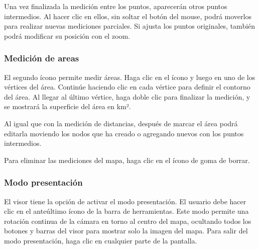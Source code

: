 \documentclass[a4paper,11pt,openany,spanish]{sphinxmanual}
\begin{document}
\noindent{}

\sphinxAtStartPar
Una vez finalizada la medición entre los puntos, aparecerán otros puntos intermedios. Al hacer clic en ellos, sin soltar el botón del mouse, podrá moverlos para realizar nuevas mediciones parciales. Si ajusta los puntos originales, también podrá modificar su posición con el zoom.

\noindent{}


\subsubsection{Medición de areas}
\label{\detokenize{tools/measuring:medicion-de-areas}}

\sphinxAtStartPar
El segundo ícono permite medir áreas. Haga clic en el ícono y luego en uno de los vértices del área. Continúe haciendo clic en cada vértice para definir el contorno del área. Al llegar al último vértice, haga doble clic para finalizar la medición, y se mostrará la superficie del área en km².

\sphinxAtStartPar
Al igual que con la medición de distancias, después de marcar el área podrá editarla moviendo los nodos que ha creado o agregando nuevos con los puntos intermedios.

\noindent{}

\sphinxAtStartPar
Para eliminar las mediciones del mapa, haga clic en el ícono de goma de borrar.



\subsubsection{Modo presentación}
\label{\detokenize{tools/measuring:modo-presentacion}}

\sphinxAtStartPar
El visor tiene la opción de activar el modo presentación. El usuario debe hacer clic en el anteúltimo ícono de la barra de herramientas. Este modo permite una rotación continua de la cámara en torno al centro del mapa, ocultando todos los botones y barras del visor para mostrar solo la imagen del mapa. Para salir del modo presentación, haga clic en cualquier parte de la pantalla.
\end{document}
